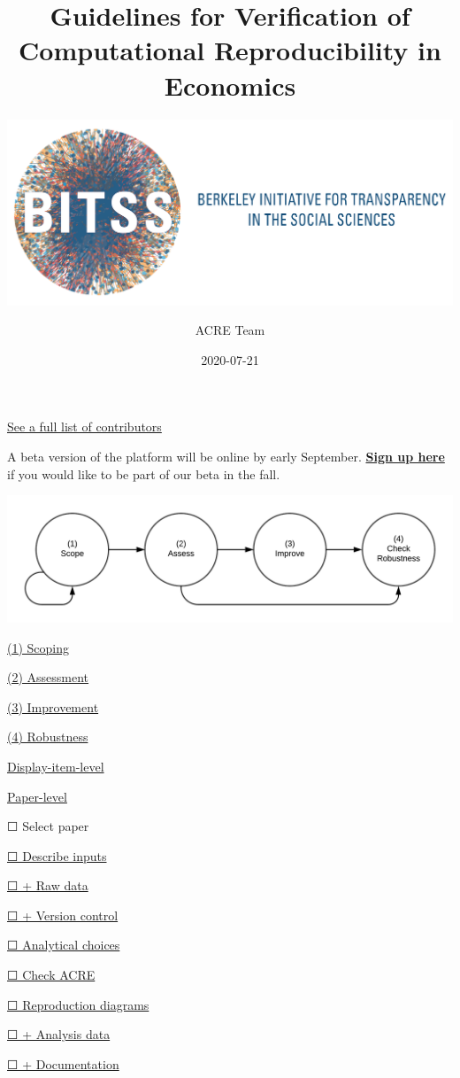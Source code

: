 \documentclass[]{book}
\title{Guidelines for Verification of Computational Reproducibility in Economics}
\subtitle{\href{https://www.bitss.org/}{\includegraphics{BITSS_logo_horizontal.png}}\\}
\author{ACRE Team}
\date{2020-07-21}
\begin{document}
\maketitle

{
\setcounter{tocdepth}{1}
\tableofcontents
}
\hypertarget{section}{%
\chapter*{}\label{section}}

\protect\hyperlink{contributions}{See a full list of contributors}

A beta version of the platform will be online by early September.
\href{https://forms.gle/yZivWcwijCzEhrBU6}{\textbf{Sign up here}} if you would like to be part of our beta in the fall.

\includegraphics[width=1\linewidth]{stages}

\protect\hyperlink{scoping}{(1) Scoping}

\protect\hyperlink{assessment}{(2) Assessment}

\protect\hyperlink{improvements}{(3) Improvement}

\protect\hyperlink{robust}{(4) Robustness}

\protect\hyperlink{di-imp}{Display-item-level}

\protect\hyperlink{paper-level}{Paper-level}

☐ Select paper

\protect\hyperlink{describe-inputs}{☐ Describe inputs}

\protect\hyperlink{rd}{☐ + Raw data}

\protect\hyperlink{paper-level}{☐ + Version control}

\protect\hyperlink{id-analy}{☐ Analytical choices}

\protect\hyperlink{check-acre}{☐ Check ACRE}

\protect\hyperlink{diagram}{☐ Reproduction diagrams}

\protect\hyperlink{ad}{☐ + Analysis data}

\protect\hyperlink{paper-level}{☐ + Documentation}
\end{document}
